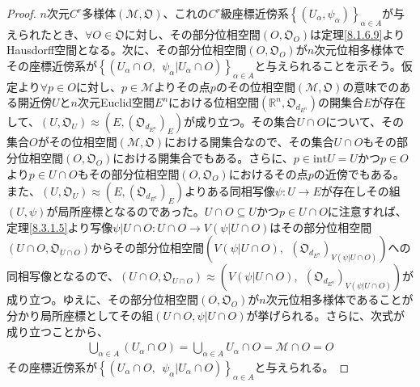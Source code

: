 \documentclass[dvipdfmx]{jsarticle}
\begin{document}
\begin{proof}
$n$次元$C^{r}$多様体$\left( \mathcal{M},\mathfrak{O} \right)$、これの$C^{r}$級座標近傍系$\left\{ \left( U_{\alpha},\psi_{\alpha} \right) \right\}_{\alpha \in A}$が与えられたとき、$\forall O \in \mathfrak{O}$に対し、その部分位相空間$\left( O,\mathfrak{O}_{O} \right)$は定理\ref{8.1.6.9}よりHausdorff空間となる。次に、その部分位相空間$\left( O,\mathfrak{O}_{O} \right)$が$n$次元位相多様体でその座標近傍系が$\left\{ \left( U_{\alpha} \cap O,\ \ \psi_{\alpha}|U_{\alpha} \cap O \right) \right\}_{\alpha \in A}$と与えられることを示そう。仮定より$\forall p \in O$に対し、$p\in \mathcal{M}$よりその点$p$のその位相空間$\left( \mathcal{M},\mathfrak{O} \right)$の意味でのある開近傍$U$と$n$次元Euclid空間$E^{n}$における位相空間$\left( \mathbb{R}^{n},\mathfrak{O}_{d_{E^{n}}} \right)$の開集合$E$が存在して、$\left( U,\mathfrak{O}_{U} \right) \approx \left( E,\left( \mathfrak{O}_{d_{E^{n}}} \right)_{E} \right)$が成り立つ。その集合$U \cap O$について、その集合$O$がその位相空間$\left( \mathcal{M},\mathfrak{O} \right)$における開集合なので、その集合$U \cap O$もその部分位相空間$\left( O,\mathfrak{O}_{O} \right)$における開集合でもある。さらに、$p \in {\mathrm{int}}U = U$かつ$p \in O$より$p \in U \cap O$もその部分位相空間$\left( O,\mathfrak{O}_{O} \right)$におけるその点$p$の近傍でもある。また、$\left( U,\mathfrak{O}_{U} \right) \approx \left( E,\left( \mathfrak{O}_{d_{E^{n}}} \right)_{E} \right)$よりある同相写像$\psi:U \rightarrow E$が存在しその組$(U,\psi)$が局所座標となるのであった。$U \cap O \subseteq U$かつ$p \in U \cap O$に注意すれば、定理\ref{8.3.1.5}より写像$\psi|U \cap O:U \cap O \rightarrow V\left( \psi|U \cap O \right)$はその部分位相空間$\left( U \cap O,\mathfrak{O}_{U \cap O} \right)$からその部分位相空間$\left( V\left( \psi|U \cap O \right),\ \ \left( \mathfrak{O}_{d_{E^{n}}} \right)_{V\left( \psi|U \cap O \right)} \right)$への同相写像となるので、$\left( U \cap O,\mathfrak{O}_{U \cap O} \right) \approx \left( V\left( \psi|U \cap O \right),\ \ \left( \mathfrak{O}_{d_{E^{n}}} \right)_{V\left( \psi|U \cap O \right)} \right)$が成り立つ。ゆえに、その部分位相空間$\left( O,\mathfrak{O}_{O} \right)$が$n$次元位相多様体であることが分かり局所座標としてその組$\left( U \cap O,\psi|U \cap O \right)$が挙げられる。さらに、次式が成り立つことから、
\begin{align*}
\bigcup_{\alpha \in A} \left( U_{\alpha} \cap O \right) = \bigcup_{\alpha \in A} U_{\alpha} \cap O = \mathcal{M}\cap O = O
\end{align*}
その座標近傍系が$\left\{ \left( U_{\alpha} \cap O,\ \ \psi_{\alpha}|U_{\alpha} \cap O \right) \right\}_{\alpha \in A}$と与えられる。\par

\end{proof}
\end{document}
